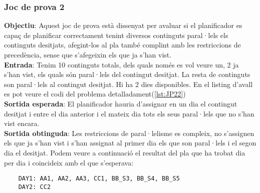 \documentclass[a4paper]{article}
\begin{document}
	\subsubsection{Joc de prova 2}
	\textbf{Objectiu}: Aquest joc de prova està dissenyat per avaluar si el planificador es capaç de planificar correctament tenint diversos continguts paral·lels els continguts desitjats, afegint-los al pla també complint amb les restriccions de precedència, sense que s'afegeixin els que ja s'han vist. \\
	\textbf{Entrada}: Tenim 10 continguts totals, dels quals només es vol veure un, 2 ja s'han vist, els quals són paral·lels del contingut desitjat. La resta de continguts son paral·lels al contingut desitjat. Hi ha 2 dies disponibles. En el listing d'avall es pot veure el codi del problema detalladament(\ref{lst:JP22})\\
	\textbf{Sortida esperada}: El planificador hauria d'assignar en un dia el contingut desitjat i entre el dia anterior i el mateix dia tots els seus paral·lels que no s'han vist encara. \\
	\textbf{Sortida obtinguda}: Les restriccions de 
	paral·lelisme es compleix, no s'assignen els que ja s'han vist i s'han assignat al primer dia els que son paral·lels i el segon dia el desitjat. Podem veure a continuació el resultat del pla que ha trobat dia per dia i coincideix amb el que s'esperava:
	
	\begin{verbatim}
	DAY1: AA1, AA2, AA3, CC1, BB_S3, BB_S4, BB_S5
	DAY2: CC2
		
	\end{verbatim}
	
\end{document}
